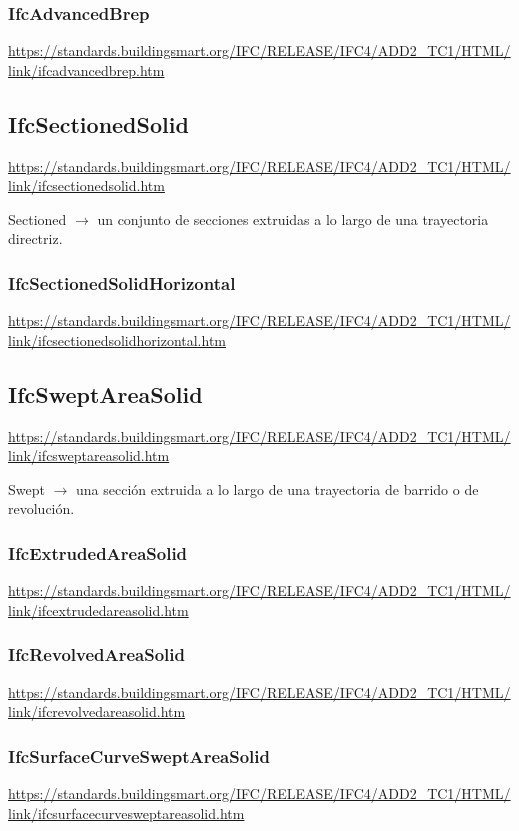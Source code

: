 \documentclass[spanish,12pt,a4paper,final,oneside]{book}
\begin{document}
\subsubsection{IfcAdvancedBrep}
\url{https://standards.buildingsmart.org/IFC/RELEASE/IFC4/ADD2_TC1/HTML/link/ifcadvancedbrep.htm}


\subsection{IfcSectionedSolid}
\url{https://standards.buildingsmart.org/IFC/RELEASE/IFC4/ADD2_TC1/HTML/link/ifcsectionedsolid.htm}

Sectioned $\rightarrow$ un conjunto de secciones extruidas a lo largo de una trayectoria directriz.

\subsubsection{IfcSectionedSolidHorizontal}
\url{https://standards.buildingsmart.org/IFC/RELEASE/IFC4/ADD2_TC1/HTML/link/ifcsectionedsolidhorizontal.htm}


\subsection{IfcSweptAreaSolid}
\url{https://standards.buildingsmart.org/IFC/RELEASE/IFC4/ADD2_TC1/HTML/link/ifcsweptareasolid.htm}

Swept $\rightarrow$ una sección extruida a lo largo de una trayectoria de barrido o de revolución.

\subsubsection{IfcExtrudedAreaSolid}
\url{https://standards.buildingsmart.org/IFC/RELEASE/IFC4/ADD2_TC1/HTML/link/ifcextrudedareasolid.htm}

\subsubsection{IfcRevolvedAreaSolid}
\url{https://standards.buildingsmart.org/IFC/RELEASE/IFC4/ADD2_TC1/HTML/link/ifcrevolvedareasolid.htm}

\subsubsection{IfcSurfaceCurveSweptAreaSolid}
\url{https://standards.buildingsmart.org/IFC/RELEASE/IFC4/ADD2_TC1/HTML/link/ifcsurfacecurvesweptareasolid.htm}
\end{document}
